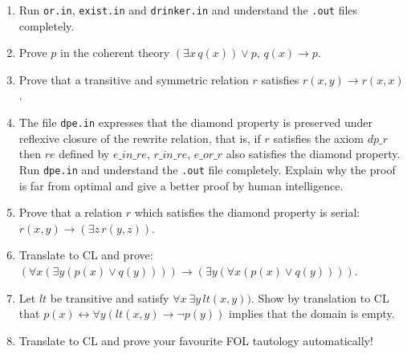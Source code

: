 \documentclass{article}
\begin{document}
\begin{enumerate}
\item Run \texttt{or.in}, \texttt{exist.in} and \texttt{drinker.in}
  and understand the \texttt{.out} files completely.

\item Prove $p$ in the coherent theory $(\exists x\, q(x)) \vee p,\, q(x)
  \to p$.
  
\item Prove that a transitive and symmetric relation $r$ satisfies
  $r(x,y) \to r(x,x)$.
  
\item The file \texttt{dpe.in} expresses that the diamond property is
  preserved under reflexive closure of the rewrite relation, that is,
  if $r$ satisfies the axiom $\mathit{dp\_r}$ then $\mathit{re}$
  defined by $\mathit{e\_in\_re}$, $\mathit{r\_in\_re}$,
  $\mathit{e\_or\_r}$ also satisfies the diamond property.  Run
  \texttt{dpe.in} and understand the \texttt{.out} file completely.
  Explain why the proof is far from optimal and give a better proof by
  human intelligence.
  
\item Prove that a relation $r$ which satisfies the diamond property
  is serial: $r(x,y) \to (\exists z\, r(y,z))$.
  
\item Translate to CL and prove: $(\forall x (\exists y (p(x) \vee q(y))))
  \to (\exists y (\forall x (p(x) \vee q(y))))$.
  
\item Let $\mathit{lt}$ be transitive and satisfy
   $\forall x~\exists y\, lt(x,y))$. 
  Show by translation to CL that $p(x) \leftrightarrow \forall y
  (\mathit{lt}(x,y) \to \neg p(y))$ implies that the domain is empty.
  
\item Translate to CL and prove your favourite FOL tautology automatically!

\end{enumerate}   
\end{document}
